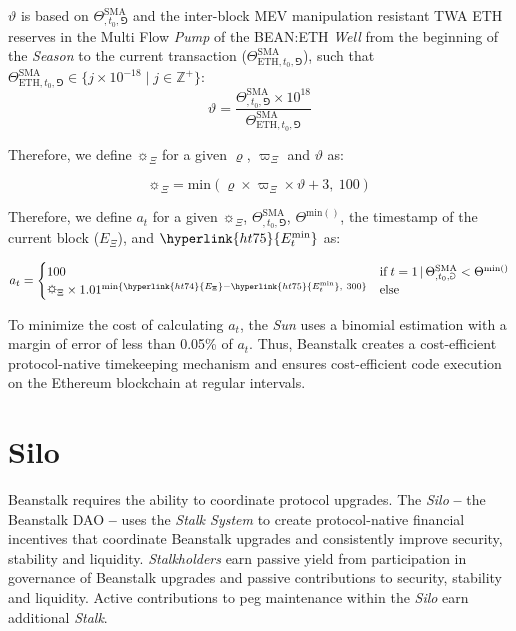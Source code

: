 \documentclass[tikz]{article}
\newcommand{\term}[1]{\textsl{#1}}
\newcommand{\bean}{} %
\begin{document}
$\vartheta$ is based on $\Theta^{\text{SMA}}_{\bean,t_0,\Game}$ and the inter-block MEV manipulation resistant TWA ETH reserves in the Multi Flow \term{Pump} of the BEAN:ETH \term{Well} from the beginning of the \term{Season} to the current transaction ($\Theta^{\text{SMA}}_{\text{ETH},t_0,\Game}$), such that $\Theta^{\text{SMA}}_{\text{ETH},t_0,\Game} \in \{j \times 10^{-18} \mid j \in \mathbb{Z}^{+} \}$:
$$ \vartheta = \frac{\Theta^{\text{SMA}}_{\bean,t_0,\Game} \times 10^{18}}{\Theta^{\text{SMA}}_{\text{ETH},t_0,\Game}}$$

Therefore, we define $\sun_{\Xi}$ for a given $\varrho$, $\varpi_\Xi$ and $\vartheta$ as:

$$\sun_{\Xi} = \text{min}(\varrho \times \varpi_\Xi \times \vartheta + 3,\ 100)$$

Therefore, we define $a_t$ for a given $\sun_{\Xi}$, $\Theta^{\text{SMA}}_{\bean,t_0,\Game}$, $\Theta^{\text{min}(\bean)}$, the timestamp of the current block ($E_\Xi$), and $\hyperlink{ht75}{E_{t}^{\text{min}}}$ as:

$$ a_t =
\begin{cases}
{100} & \text{if} \; t = 1 \mkern3mu | \mkern3mu \Theta^{\text{SMA}}_{\bean,t_0,\Game} < \Theta^{\text{min}(\bean)}  \\
{\sun_{\Xi} \times 1.01^{\text{min}\{{\hyperlink{ht74}{E_\Xi} - \hyperlink{ht75}{E_{t}^{\text{min}}}},\ 300\}}} & \text{else}
\end{cases} 
$$

To minimize the cost of calculating \hyperlink{ht11}{$a_t$}, the \term{Sun} uses a binomial estimation with a margin of error of less than 0.05\% of \hyperlink{ht11}{$a_t$}. Thus, Beanstalk creates a cost-efficient protocol-native timekeeping mechanism and ensures cost-efficient code execution on the Ethereum blockchain at regular intervals.

\vspace*{-1mm}
\section{Silo}
\vspace*{-1mm}
Beanstalk requires the ability to coordinate protocol upgrades. The \term{Silo} \textbf{--} the Beanstalk DAO \textbf{--} uses the \term{Stalk System} to create protocol-native financial incentives that coordinate Beanstalk upgrades and consistently improve security, stability and liquidity. \term{Stalkholders} earn passive yield from participation in governance of Beanstalk upgrades and passive contributions to security, stability and liquidity. Active contributions to peg maintenance within the \term{Silo} earn additional \term{Stalk}.
\end{document}
